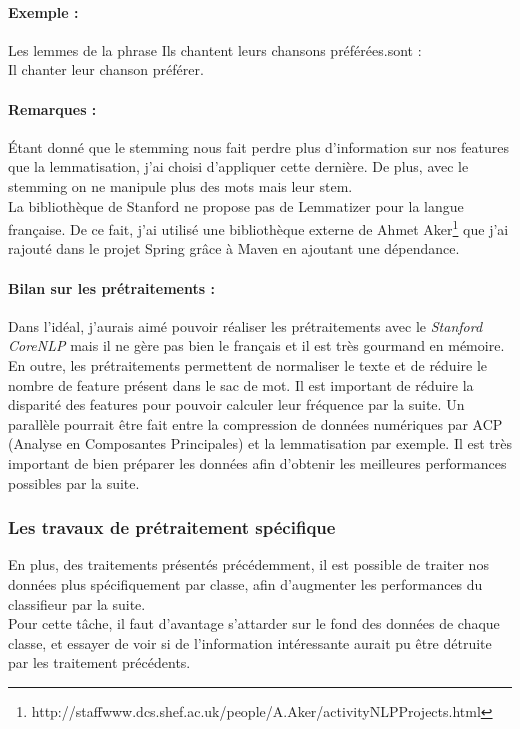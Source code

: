                 \paragraph{Exemple :}
                    Les lemmes de la phrase \og Ils chantent leurs chansons préférées.\fg sont :\\
                     \og Il chanter leur chanson préférer. \fg

                \paragraph{Remarques :}
                    Étant donné que le stemming nous fait perdre plus d'information sur nos features que la lemmatisation, j'ai choisi d'appliquer cette dernière. De plus, avec le stemming on ne manipule plus des mots mais leur stem.\\
                    La bibliothèque de Stanford ne propose pas de Lemmatizer pour la langue française. De ce fait, j'ai utilisé une bibliothèque externe de Ahmet Aker\footnote{http://staffwww.dcs.shef.ac.uk/people/A.Aker/activityNLPProjects.html} que j'ai rajouté dans le projet Spring grâce à Maven en ajoutant une dépendance.

                \paragraph{Bilan sur les prétraitements :}
                    Dans l'idéal, j'aurais aimé pouvoir réaliser les prétraitements avec le \textit{Stanford CoreNLP} mais il ne gère pas bien le français et il est très gourmand en mémoire.\\

                    En outre, les prétraitements permettent de normaliser le texte et de réduire le nombre de feature présent dans le sac de mot. Il est important de réduire la disparité des features pour pouvoir calculer leur fréquence par la suite. Un parallèle pourrait être fait entre la compression de données numériques par ACP (Analyse en Composantes Principales) et la lemmatisation par exemple. Il est très important de bien préparer les données afin d'obtenir les meilleures performances possibles par la suite.

            \subsubsection{Les travaux de prétraitement spécifique}
                En plus, des traitements présentés précédemment, il est possible de traiter nos données plus spécifiquement par classe, afin d'augmenter les performances du classifieur par la suite.\\
                Pour cette tâche, il faut d'avantage s'attarder sur le fond des données de chaque classe, et essayer de voir si de l'information intéressante aurait pu être détruite par les traitement précédents.

